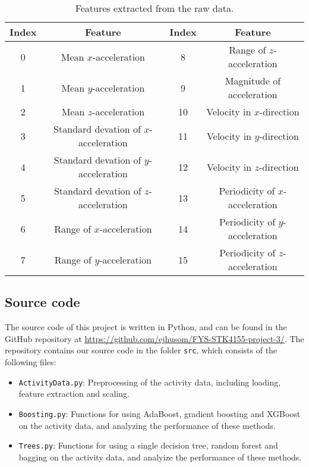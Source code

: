 \begin{table}[]
    \centering
    \caption{Features extracted from the raw data.}
    \begin{tabular}{|c|c||c|c|}
    \hline
    Index & Feature & Index & Feature \\
    \hline
    0     & Mean $x$-acceleration & 8 & Range of $z$-acceleration \\
    \hline
    1     & Mean $y$-acceleration & 9 & Magnitude of acceleration \\
    \hline
    2     & Mean $z$-acceleration & 10 & Velocity in $x$-direction \\
    \hline
    3     & Standard devation of $x$-acceleration & 11 & Velocity in $y$-direction \\
    \hline
    4     & Standard devation of $y$-acceleration & 12 & Velocity in $z$-direction  \\
    \hline
    5     & Standard devation of $z$-acceleration & 13 & Periodicity of $x$-acceleration \\
    \hline
    6     & Range of $x$-acceleration & 14 & Periodicity of $y$-acceleration \\
    \hline
    7     & Range of $y$-acceleration & 15 & Periodicity of $z$-acceleration \\
    \hline
    \end{tabular}
    \label{tab:features}
\end{table}



\subsection{Source code}

The source code of this project is written in Python, and can be found in the GitHub repository at \url{https://github.com/ejhusom/FYS-STK4155-project-3/}. The repository contains our source code in the folder \texttt{src}, which consists of the following files:

\begin{itemize}
    \item \texttt{ActivityData.py}: Preprocessing of the activity data, including loading, feature extraction and scaling.
    \item \texttt{Boosting.py}: Functions for using AdaBoost, gradient boosting and XGBoost on the activity data, and analyzing the performance of these methods.
    \item \texttt{Trees.py}: Functions for using a single decision tree, random forest and bagging on the activity data, and analyize the performance of these methods.
\end{itemize}
